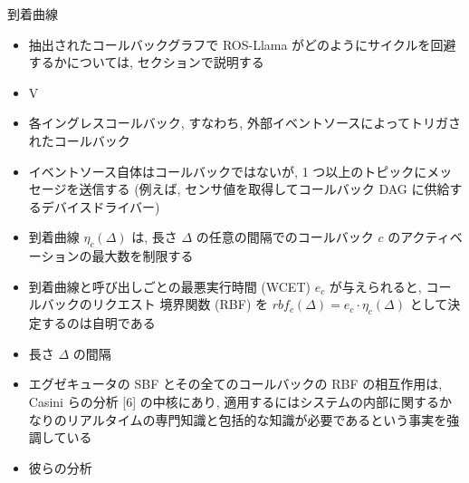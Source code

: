 \begin{frame}{到着曲線}
    \begin{itemize}
        \item 抽出されたコールバックグラフで ROS-Llama がどのようにサイクルを回避するかについては, セクションで説明する
\item V
\item 各イングレスコールバック, すなわち, 外部イベントソースによってトリガされたコールバック
\item イベントソース自体はコールバックではないが, 1 つ以上のトピックにメッセージを送信する (例えば, センサ値を取得してコールバック DAG に供給するデバイスドライバー)
\item 到着曲線 $\eta_{c}(\Delta)$ は, 長さ $\Delta$ の任意の間隔でのコールバック $c$ のアクティベーションの最大数を制限する
    \end{itemize}
\end{frame}

\begin{frame}{}
    \begin{itemize}
        \item 到着曲線と呼び出しごとの最悪実行時間 (WCET) $e_{c}$ が与えられると, コールバックのリクエスト 境界関数 (RBF) を $r b f_{c}(\Delta)=e_{c} \cdot \eta_{c}(\Delta)$ として決定するのは自明である
\item 長さ $\Delta$ の間隔
\item エグゼキュータの SBF とその全てのコールバックの RBF の相互作用は, Casini らの分析 [6] の中核にあり, 適用するにはシステムの内部に関するかなりのリアルタイムの専門知識と包括的な知識が必要であるという事実を強調している
\item 彼らの分析
    \end{itemize}
\end{frame}
